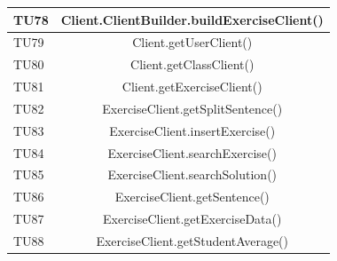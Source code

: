 \begin{longtable}{|>{\centering\arraybackslash}m{1.6cm}|c|}
		\rowcolor{LightGray}
		TU78 & Client.ClientBuilder.buildExerciseClient()  \\ \hline
		TU79 & Client.getUserClient()  \\ \hline
		\rowcolor{LightGray}
		TU80 & Client.getClassClient()  \\ \hline
		TU81 & Client.getExerciseClient()  \\ \hline
		\rowcolor{LightGray}
		TU82 & ExerciseClient.getSplitSentence()  \\ \hline
		TU83 & ExerciseClient.insertExercise()  \\ \hline
		\rowcolor{LightGray}
		TU84 & ExerciseClient.searchExercise()  \\ \hline
		TU85 & ExerciseClient.searchSolution()  \\ \hline
		\rowcolor{LightGray}
		TU86 & ExerciseClient.getSentence()  \\ \hline
		TU87 & ExerciseClient.getExerciseData()  \\ \hline
		\rowcolor{LightGray}
		TU88 & ExerciseClient.getStudentAverage()  \\ \hline
		

\end{longtable}
